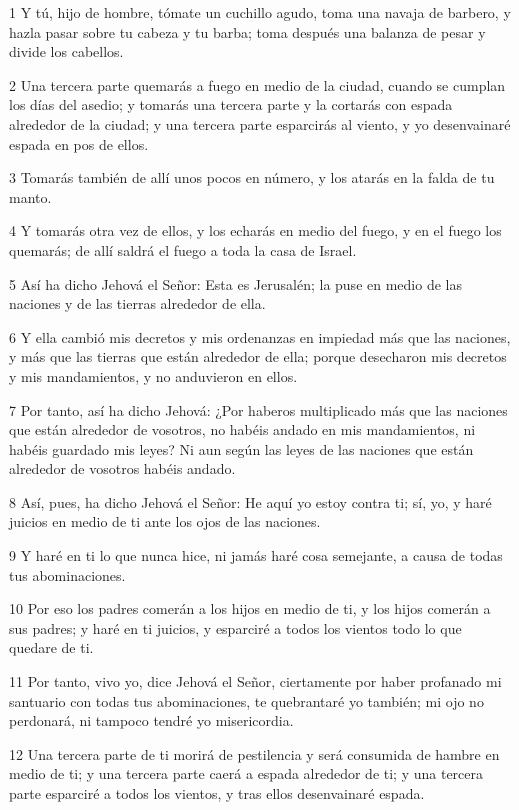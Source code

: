 \par 1 Y tú, hijo de hombre, tómate un cuchillo agudo, toma una navaja de barbero, y hazla pasar sobre tu cabeza y tu barba; toma después una balanza de pesar y divide los cabellos.
\par 2 Una tercera parte quemarás a fuego en medio de la ciudad, cuando se cumplan los días del asedio; y tomarás una tercera parte y la cortarás con espada alrededor de la ciudad; y una tercera parte esparcirás al viento, y yo desenvainaré espada en pos de ellos.
\par 3 Tomarás también de allí unos pocos en número, y los atarás en la falda de tu manto.
\par 4 Y tomarás otra vez de ellos, y los echarás en medio del fuego, y en el fuego los quemarás; de allí saldrá el fuego a toda la casa de Israel.
\par 5 Así ha dicho Jehová el Señor: Esta es Jerusalén; la puse en medio de las naciones y de las tierras alrededor de ella.
\par 6 Y ella cambió mis decretos y mis ordenanzas en impiedad más que las naciones, y más que las tierras que están alrededor de ella; porque desecharon mis decretos y mis mandamientos, y no anduvieron en ellos.
\par 7 Por tanto, así ha dicho Jehová: ¿Por haberos multiplicado más que las naciones que están alrededor de vosotros, no habéis andado en mis mandamientos, ni habéis guardado mis leyes? Ni aun según las leyes de las naciones que están alrededor de vosotros habéis andado.
\par 8 Así, pues, ha dicho Jehová el Señor: He aquí yo estoy contra ti; sí, yo, y haré juicios en medio de ti ante los ojos de las naciones.
\par 9 Y haré en ti lo que nunca hice, ni jamás haré cosa semejante, a causa de todas tus abominaciones. 
\par 10 Por eso los padres comerán a los hijos en medio de ti, y los hijos comerán a sus padres; y haré en ti juicios, y esparciré a todos los vientos todo lo que quedare de ti.
\par 11 Por tanto, vivo yo, dice Jehová el Señor, ciertamente por haber profanado mi santuario con todas tus abominaciones, te quebrantaré yo también; mi ojo no perdonará, ni tampoco tendré yo misericordia.
\par 12 Una tercera parte de ti morirá de pestilencia y será consumida de hambre en medio de ti; y una tercera parte caerá a espada alrededor de ti; y una tercera parte esparciré a todos los vientos, y tras ellos desenvainaré espada.
